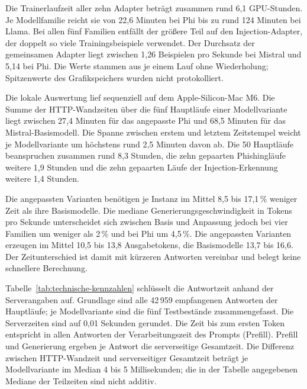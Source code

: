 \documentclass[12pt,twoside=false,a4paper,parskip]{scrbook}
\begin{document}
Die Trainerlaufzeit aller zehn Adapter beträgt zusammen rund 6{,}1 GPU-Stunden. Je Modellfamilie reicht sie von 22{,}6 Minuten bei Phi bis zu rund 124 Minuten bei Llama. Bei allen fünf Familien entfällt der größere Teil auf den Injection-Adapter, der doppelt so viele Trainingsbeispiele verwendet. Der Durchsatz der gemeinsamen Adapter liegt zwischen 1{,}26 Beispielen pro Sekunde bei Mistral und 5{,}14 bei Phi. Die Werte stammen aus je einem Lauf ohne Wiederholung; Spitzenwerte des Grafikspeichers wurden nicht protokolliert.

Die lokale Auswertung lief sequenziell auf dem Apple-Silicon-Mac M6. Die Summe der HTTP-Wandzeiten über die fünf Hauptläufe einer Modellvariante liegt zwischen 27{,}4 Minuten für das angepasste Phi und 68{,}5 Minuten für das Mistral-Basismodell. Die Spanne zwischen erstem und letztem Zeitstempel weicht je Modellvariante um höchstens rund 2{,}5 Minuten davon ab. Die 50 Hauptläufe beanspruchen zusammen rund 8{,}3 Stunden, die zehn gepaarten Phishingläufe weitere 1{,}9 Stunden und die zehn gepaarten Läufe der Injection-Erkennung weitere 1{,}4 Stunden.

Die angepassten Varianten benötigen je Instanz im Mittel 8{,}5 bis 17{,}1\,\% weniger Zeit als ihre Basismodelle. Die mediane Generierungsgeschwindigkeit in Tokens pro Sekunde unterscheidet sich zwischen Basis und Anpassung jedoch bei vier Familien um weniger als 2\,\% und bei Phi um 4{,}5\,\%. Die angepassten Varianten erzeugen im Mittel 10{,}5 bis 13{,}8 Ausgabetokens, die Basismodelle 13{,}7 bis 16{,}6. Der Zeitunterschied ist damit mit kürzeren Antworten vereinbar und belegt keine schnellere Berechnung.

Tabelle~\ref{tab:technische-kennzahlen} schlüsselt die Antwortzeit anhand der Serverangaben auf. Grundlage sind alle 42\,959 empfangenen Antworten der Hauptläufe; je Modellvariante sind die fünf Testbestände zusammengefasst. Die Serverzeiten sind auf 0{,}01 Sekunden gerundet. Die Zeit bis zum ersten Token entspricht in allen Antworten der Verarbeitungszeit des Prompts (Prefill). Prefill und Generierung ergeben je Antwort die serverseitige Gesamtzeit. Die Differenz zwischen HTTP-Wandzeit und serverseitiger Gesamtzeit beträgt je Modellvariante im Median 4 bis 5 Millisekunden; die in der Tabelle angegebenen Mediane der Teilzeiten sind nicht additiv.
\end{document}

